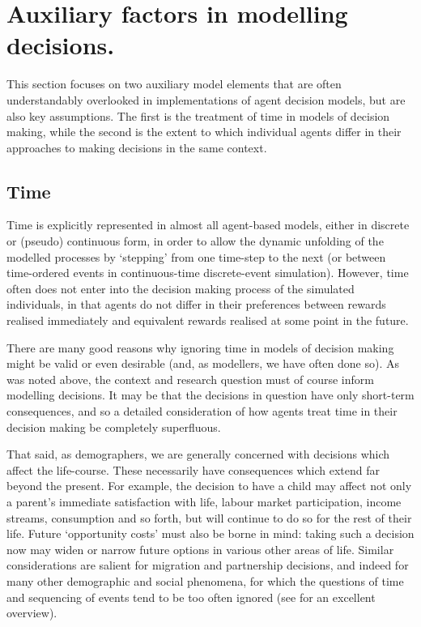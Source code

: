 \documentclass{article}
\begin{document}
\section{Auxiliary factors in modelling
decisions.}\label{auxiliary-factors-in-modelling-decisions}

This section focuses on two auxiliary model elements that are often understandably overlooked in implementations of agent decision models, but are also key assumptions. The first is the treatment of time in models of decision making, while the second is the extent to which individual agents differ in their approaches to making decisions in the same context.

\subsection{Time}\label{time}

Time is explicitly represented in almost all agent-based models, either in discrete or (pseudo) continuous form, in order to allow the dynamic unfolding of the modelled processes by `stepping' from one time-step to the next (or between time-ordered events in continuous-time discrete-event simulation). However, time often  does not enter into the decision making process of the simulated individuals, in that agents do not differ in their preferences between rewards realised immediately and equivalent rewards realised at some point in the future. 

There are many good reasons why ignoring time in models of decision making might be valid or even desirable (and, as modellers, we have often done so). As was noted above, the context and research question must of course inform modelling decisions. It may be that the decisions in question have only short-term consequences, and so a detailed consideration of how agents treat time in their decision making be completely superfluous.

That said, as demographers, we are generally concerned with decisions which affect the life-course. These necessarily have consequences which extend far beyond the present. For example, the decision to have a child may affect not only a parent's immediate satisfaction with life, labour market participation, income streams, consumption and so forth, but will continue to do so for the rest of their life. Future `opportunity costs' must also be borne in mind: taking such a decision now may widen or narrow future options in various other areas of life. Similar considerations are salient for migration and partnership decisions, and indeed for many other demographic and social phenomena, for which the questions of time and sequencing of events tend to be too often ignored (see \citet{Abbott2001} for an excellent overview).
\end{document}
